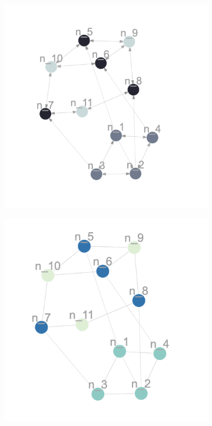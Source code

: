\documentclass[12pt,a4paper]{article}
\begin{document}
\begin{figure}[H]
  \begin{subfigure}[b]{0.3\textwidth}
    \centering
    \includegraphics[width=\textwidth]{toy_net/unweighted t20.png}
    \caption{}
    \label{fig:DTRW t20k3}
  \end{subfigure}
  \hfill
  \begin{subfigure}[b]{0.3\textwidth}
    \centering
    \includegraphics[width=\textwidth]{toy_net/walktrap t20.png}

\end{subfigure}
\end{figure}
\end{document}
